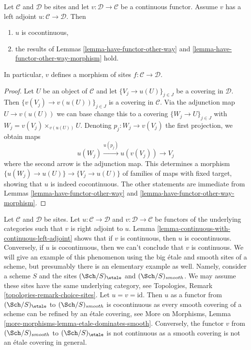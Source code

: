\begin{lemma}
\label{lemma-continuous-with-continuous-left-adjoint}
Let $\mathcal{C}$ and $\mathcal{D}$ be sites and let
$v : \mathcal{D} \to \mathcal{C}$ be a continuous functor.
Assume $v$ has a left adjoint $u : \mathcal{C} \to \mathcal{D}$. Then
\begin{enumerate}
\item $u$ is cocontinuous,
\item the results of Lemmas \ref{lemma-have-functor-other-way} and
\ref{lemma-have-functor-other-way-morphism} hold.
\end{enumerate}
In particular, $v$ defines a morphism of sites
$f : \mathcal{C} \to \mathcal{D}$.
\end{lemma}

\begin{proof}
Let $U$ be an object of $\mathcal{C}$ and let $\{V_j \to u(U)\}_{j \in J}$
be a covering in $\mathcal{D}$. Then $\{v(V_j) \to v(u(U))\}_{j \in J}$ is
a covering in $\mathcal{C}$. Via the adjunction map $U \to v(u(U))$ we
can base change this to a covering $\{W_j \to U\}_{j \in J}$ with
$W_j = v(V_j) \times_{v(u(U))} U$. Denoting $p_j : W_j \to v(V_j)$ the
first projection, we obtain maps
$$
u(W_j) \xrightarrow{u(p_j)} u(v(V_j)) \longrightarrow V_j
$$
where the second arrow is the adjunction map. This determines a morphism
$\{u(W_j) \to u(U)\} \to \{V_j \to u(U)\}$ of families of maps with fixed
target, showing that $u$ is indeed cocontinuous. The other statements are
immediate from Lemmas \ref{lemma-have-functor-other-way} and
\ref{lemma-have-functor-other-way-morphism}.
\end{proof}

\begin{example}
\label{example-not-equivalent}
Let $\mathcal{C}$ and $\mathcal{D}$ be sites. Let
$u : \mathcal{C} \to \mathcal{D}$ and $v : \mathcal{D} \to \mathcal{C}$
be functors of the underlying categories such that $v$ is right adjoint to $u$.
Lemma \ref{lemma-continuous-with-continuous-left-adjoint}
shows that if $v$ is continuous, then $u$ is cocontinuous.
Conversely, if $u$ is cocontinuous, then we can't conclude that $v$
is continuous. We will give an example of this phenomenon using
the big \'etale and smooth sites of a scheme, but presumably there is an
elementary example as well. Namely, consider a scheme $S$ and the sites
$(\Sch/S)_\etale$ and $(\Sch/S)_{smooth}$. We may assume these
sites have the same underlying category, see
Topologies, Remark \ref{topologies-remark-choice-sites}.
Let $u = v = \text{id}$. Then $u$ as a functor
from $(\Sch/S)_\etale$ to $(\Sch/S)_{smooth}$ is cocontinuous
as every smooth covering of a scheme can be refined by an \'etale
covering, see More on Morphisms, Lemma
\ref{more-morphisms-lemma-etale-dominates-smooth}.
Conversely, the functor $v$ from $(\Sch/S)_{smooth}$ to $(\Sch/S)_\etale$
is not continuous as a smooth covering is not an \'etale covering in general.
\end{example}




